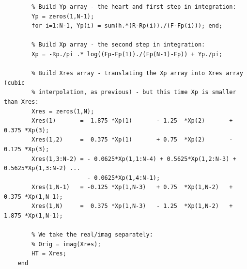 \documentclass[12pt,twoside,a4paper]{article}
\numberwithin{equation}{subsection}
\numberwithin{figure}{subsection}
\begin{document}
\begin{lstlisting}
	    % Build Yp array - the heart and first step in integration:
	    Yp = zeros(1,N-1);
	    for i=1:N-1, Yp(i) = sum(h.*(R-Rp(i))./(F-Fp(i))); end;
	    
	    % Build Xp array - the second step in integration:
	    Xp = -Rp./pi .* log((Fp-Fp(1))./(Fp(N-1)-Fp)) + Yp./pi;
	    
	    % Build Xres array - translating the Xp array into Xres array (cubic
	    % interpolation, as previous) - but this time Xp is smaller than Xres:
	    Xres = zeros(1,N);
	    Xres(1)       =  1.875 *Xp(1)       - 1.25  *Xp(2)       + 0.375 *Xp(3);
	    Xres(1,2)     =  0.375 *Xp(1)       + 0.75  *Xp(2)       - 0.125 *Xp(3);
	    Xres(1,3:N-2) = - 0.0625*Xp(1,1:N-4) + 0.5625*Xp(1,2:N-3) + 0.5625*Xp(1,3:N-2) ...
	                    - 0.0625*Xp(1,4:N-1);
	    Xres(1,N-1)   = -0.125 *Xp(1,N-3)   + 0.75  *Xp(1,N-2)   + 0.375 *Xp(1,N-1);
	    Xres(1,N)     =  0.375 *Xp(1,N-3)   - 1.25  *Xp(1,N-2)   + 1.875 *Xp(1,N-1);
	    
	    % We take the real/imag separately:
	    % Orig = imag(Xres);
	    HT = Xres;
	end
\end{lstlisting}
\end{document}
